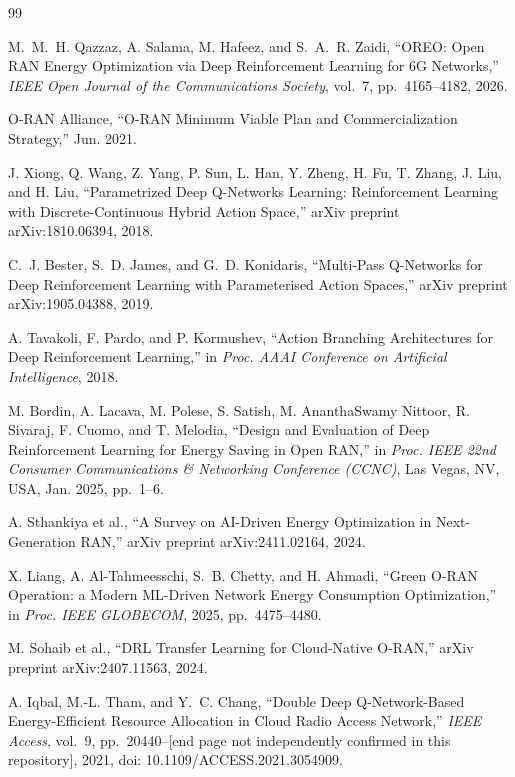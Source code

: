 \begin{thebibliography}{99}

M.~M.~H. Qazzaz, A. Salama, M. Hafeez, and S.~A.~R. Zaidi,
``OREO: Open RAN Energy Optimization via Deep Reinforcement Learning for 6G
Networks,'' \emph{IEEE Open Journal of the Communications Society}, vol.~7,
pp.~4165--4182, 2026.

O-RAN Alliance, ``O-RAN Minimum Viable Plan and Commercialization
Strategy,'' Jun. 2021.

J. Xiong, Q. Wang, Z. Yang, P. Sun, L. Han, Y. Zheng, H. Fu, T. Zhang, J. Liu,
and H. Liu, ``Parametrized Deep Q-Networks Learning: Reinforcement Learning
with Discrete-Continuous Hybrid Action Space,'' arXiv preprint
arXiv:1810.06394, 2018.

C.~J. Bester, S.~D. James, and G.~D. Konidaris, ``Multi-Pass Q-Networks for
Deep Reinforcement Learning with Parameterised Action Spaces,'' arXiv
preprint arXiv:1905.04388, 2019.

A. Tavakoli, F. Pardo, and P. Kormushev, ``Action Branching Architectures for
Deep Reinforcement Learning,'' in \emph{Proc. AAAI Conference on Artificial
Intelligence}, 2018.

M. Bordin, A. Lacava, M. Polese, S. Satish, M. AnanthaSwamy Nittoor,
R. Sivaraj, F. Cuomo, and T. Melodia, ``Design and Evaluation of Deep
Reinforcement Learning for Energy Saving in Open RAN,'' in \emph{Proc. IEEE
22nd Consumer Communications \& Networking Conference (CCNC)}, Las Vegas,
NV, USA, Jan. 2025, pp.~1--6.

A. Sthankiya et al., ``A Survey on AI-Driven Energy Optimization in
Next-Generation RAN,'' arXiv preprint arXiv:2411.02164, 2024.

X. Liang, A. Al-Tahmeesschi, S.~B. Chetty, and H. Ahmadi, ``Green O-RAN
Operation: a Modern ML-Driven Network Energy Consumption Optimization,'' in
\emph{Proc. IEEE GLOBECOM}, 2025, pp.~4475--4480.

M. Sohaib et al., ``DRL Transfer Learning for Cloud-Native O-RAN,''
arXiv preprint arXiv:2407.11563, 2024.

A. Iqbal, M.-L. Tham, and Y.~C. Chang, ``Double Deep Q-Network-Based
Energy-Efficient Resource Allocation in Cloud Radio Access Network,''
\emph{IEEE Access}, vol.~9, pp.~20440--[end page not independently
confirmed in this repository], 2021, doi: 10.1109/ACCESS.2021.3054909.


\end{thebibliography}
